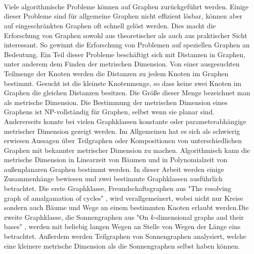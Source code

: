 \thispagestyle{empty}
~
\newpage

\thispagestyle{empty}
\section*{}

Viele algorithmische Probleme können auf Graphen zurückgeführt werden. Einige dieser Probleme sind für allgemeine Graphen nicht effizient lösbar, können aber auf eingeschränkten Graphen oft schnell gelöst werden. Dies macht die Erforschung von Graphen sowohl aus theoretischer als auch aus praktischer Sicht interessant.  So gewinnt die Erforschung von Problemen auf speziellen Graphen an Bedeutung. Ein Teil dieser Probleme beschäftigt sich mit Distanzen in Graphen, unter anderem dem Finden der metrischen Dimension.\newline\newline
Von einer ausgesuchten Teilmenge der Knoten werden die Distanzen zu jedem Knoten im Graphen bestimmt. Gesucht ist die kleinste Knotenmenge, so dass keine zwei Knoten im Graphen die gleichen Distanzen besitzen. Die Größe dieser Menge bezeichnet man als metrische Dimension. Die Bestimmung der metrischen Dimension eines Graphens ist NP-vollständig für Graphen, selbst wenn sie planar sind.\newline\newline 
Andererseits konnte bei vielen Graphklassen konstante oder parameterabhängige metrischer Dimension gezeigt werden.\newline\newline 
Im Allgemeinen hat es sich als schwierig erwiesen Aussagen über Teilgraphen oder Kompositionen von unterschiedlichen Graphen mit bekannter metrischer Dimension zu machen. Algorithmisch kann die metrische Dimension in Linearzeit von Bäumen und in Polynomialzeit von außenplanaren Graphen bestimmt werden.\newline\newline
In dieser Arbeit werden einige Zusammenhänge bewiesen und zwei bestimmte Graphklassen ausführlich betrachtet.\newline\newline 
Die erste Graphklasse, Freundschaftsgraphen aus "The resolving graph of amalgamation of cycles" \cite{amal}, wird verallgemeinert, wobei nicht nur Kreise sondern auch Bäume und Wege an einem bestimmten Knoten erlaubt werden.\newline Die zweite Graphklasse, die Sonnengraphen aus "On $k$-dimensional graphs and their bases" \cite{bases}, werden mit beliebig langen Wegen an Stelle von Wegen der Länge eins betrachtet. Außerdem werden Teilgraphen von Sonnengraphen analysiert, welche eine kleinere metrische Dimension als die Sonnengraphen selbst haben können.\newline\newline 
